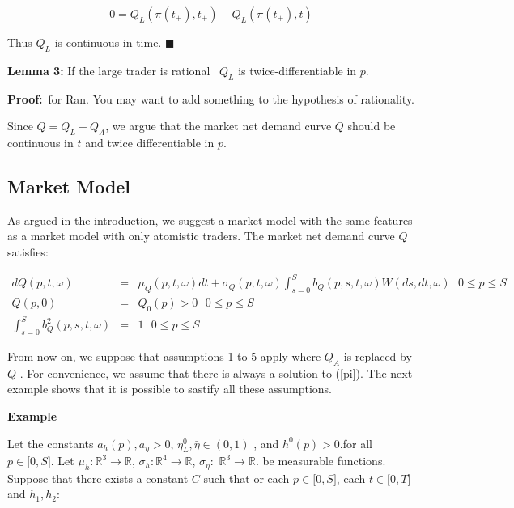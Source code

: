 \documentclass{article}
\begin{document}
\begin{equation*}
0=Q_{L}(\pi (t_{+}),t_{+})-Q_{L}(\pi (t_{+}),t)
\end{equation*}

Thus $Q_{L}$ is continuous in time. $\blacksquare $

\bigskip

\textbf{Lemma 3: }If the large trader is rational \ $Q_{L}$ is
twice-differentiable in $p$.

\bigskip

\textbf{Proof:}\ for Ran. You may want to add something to the hypothesis of
rationality.

Since $Q=Q_{L}+Q_{A}$, we argue that the market net demand curve $Q$ should
be continuous in $t$ and twice differentiable in $p$.

\bigskip

\subsection{Market Model}

As argued in the introduction, we suggest a market model with the same
features as a market model with only atomistic traders. The market net
demand curve $Q$ satisfies:

\begin{eqnarray}
dQ(p,t,\omega ) &=&\mu _{Q}(p,t,\omega )dt+\sigma _{Q}(p,t,\omega
)\int_{s=0}^{S}b_{Q}(p,s,t,\omega )W(ds,dt,\omega )\text{ \ \ \ }0\leq p\leq
S  \label{MM1} \\
Q(p,0) &=&Q_{0}(p)>0\text{ \ \ \ \ \ \ \ \ }0\leq p\leq S  \label{MM2} \\
\int_{s=0}^{S}b_{Q}^{2}(p,s,t,\omega ) &=&1\text{ \ \ \ \ \ \ \ \ }0\leq
p\leq S  \label{MM3}
\end{eqnarray}

From now on, we suppose that assumptions 1 to 5 apply where $Q_{A}$ is
replaced by $Q$ . For convenience, we assume that there is always a solution
to (\ref{pi}). The next example shows that it is possible to sastify all
these assumptions.

\textbf{Example}

Let the constants $a_{h}(p),a_{\eta }>0$, $\eta _{L}^{0},\bar{\eta}\in (0,1)$%
, and $h^{0}(p)>0$.for all $p\in \lbrack 0,S]$. Let $\mu _{h}:\mathbb{R}%
^{3}\rightarrow \mathbb{R}$, $\sigma _{h}:\mathbb{R}^{4}\rightarrow \mathbb{R%
}$, $\sigma _{\eta }:$ $\mathbb{R}^{3}\rightarrow \mathbb{R}$. be measurable
functions. Suppose that there exists a constant $C$ such that or each $p\in
\lbrack 0,S]$, each $t\in \lbrack 0,T]$ and $h_{1},h_{2}$:
\end{document}
